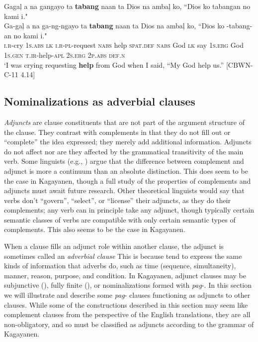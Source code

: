 \ea
\label{bkm:Ref117751045}
Gagaļ  a  na  gangayo  ta  \textbf{tabang}  naan  ta  Dios na  ambaļ  ko,  ``Dios  ko  tabangan  no  kami  i." \smallskip\\
\gll Ga-gaļ  a  na  ga-ng-ngayo  ta  \textbf{tabang}  naan  ta  Dios na  ambaļ  ko,  ``Dios  ko  \emptyset{}-tabang-an  no  kami  i." \\
\textsc{i.r}-cry  1\textsc{s.abs}  \textsc{lk}  \textsc{i.r-pl}-request  \textsc{nabs}  help  \textsc{spat.def}  \textsc{nabs}  God
\textsc{lk}   say  1\textsc{s.erg}  God  1\textsc{s.gen}  \textsc{t.ir}-help-\textsc{apl}  2\textsc{s.erg}  2\textsc{p.abs}  \textsc{def.n} \\
\glt `I was crying requesting \textbf{help} from God when I said, “My God help us.” [CBWN-C-11 4.14]
\z

\subsection{Nominalizations as adverbial clauses}
\label{bkm:Ref115861741} \label{sec:nominalizationsasadverbialclauses}
\textit{Adjuncts} are clause constituents that are not part of the argument structure of the clause. They contrast with complements in that they do not fill out or “complete” the idea expressed; they merely add additional information. Adjuncts do not affect nor are they affected by the grammatical transitivity of the main verb. Some linguists (e.g., \citealt{huddleston2002, payne2011}) argue that the difference between complement and adjunct is more a continuum than an absolute distinction. This does seem to be the case in Kagayanen, though a full study of the properties of complements and adjuncts must await future research. Other theoretical linguists would say that verbs don’t “govern”, “select”, or “license” their adjuncts, as they do their complements; any verb can in principle take any adjunct, though typically certain semantic classes of verbs are compatible with only certain semantic types of complements. This also seems to be the case in Kagayanen.

When a clause fills an adjunct role within another clause, the adjunct is sometimes called an \textit{adverbial clause} This is because  tend to express the same kinds of information that adverbs do, such as time (sequence, simultaneity), manner, reason, purpose, and condition. In Kagayanen, adjunct clauses may be subjunctive (), fully finite (), or nominalizations formed with \textit{pag}{}-. In this section we will illustrate and describe some \textit{pag}{}- clauses functioning as adjuncts to other clauses. While some of the constructions described in this section may seem like complement clauses from the perspective of the English translations, they are all non-obligatory, and so must be classified as adjuncts according to the grammar of Kagayanen.

